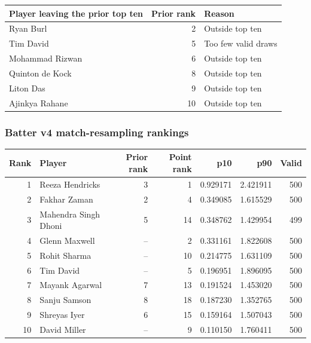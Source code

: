 \begin{center}
\begin{tabularx}{\linewidth}{>{\raggedright\arraybackslash}Xr>{\raggedright\arraybackslash}X}
\toprule
Player leaving the prior top ten & Prior rank & Reason \\
\midrule
Ryan Burl & 2 & Outside top ten \\
Tim David & 5 & Too few valid draws \\
Mohammad Rizwan & 6 & Outside top ten \\
Quinton de Kock & 8 & Outside top ten \\
Liton Das & 9 & Outside top ten \\
Ajinkya Rahane & 10 & Outside top ten \\
\bottomrule
\end{tabularx}
\end{center}

\clearpage

\subsubsection*{Batter v4 match-resampling rankings}

\begin{center}
\begin{tabularx}{\linewidth}{r>{\raggedright\arraybackslash}Xrrrrr}
\toprule
Rank & Player & Prior rank & Point rank & p10 & p90 & Valid \\
\midrule
1 & Reeza Hendricks & 3 & 1 & 0.929171 & 2.421911 & 500 \\
2 & Fakhar Zaman & 2 & 4 & 0.349085 & 1.615529 & 500 \\
3 & Mahendra Singh Dhoni & 5 & 14 & 0.348762 & 1.429954 & 499 \\
4 & Glenn Maxwell & -- & 2 & 0.331161 & 1.822608 & 500 \\
5 & Rohit Sharma & -- & 10 & 0.214775 & 1.631109 & 500 \\
6 & Tim David & -- & 5 & 0.196951 & 1.896095 & 500 \\
7 & Mayank Agarwal & 7 & 13 & 0.191524 & 1.453020 & 500 \\
8 & Sanju Samson & 8 & 18 & 0.187230 & 1.352765 & 500 \\
9 & Shreyas Iyer & 6 & 15 & 0.159164 & 1.507043 & 500 \\
10 & David Miller & -- & 9 & 0.110150 & 1.760411 & 500 \\
\bottomrule
\end{tabularx}
\end{center}


